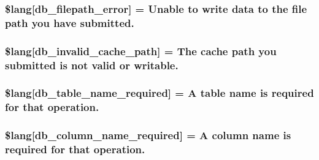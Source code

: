 \subsubsection[{\$lang}]{\setlength{\rightskip}{0pt plus 5cm}\$lang\mbox{[}\textquotesingle{}db\+\_\+filepath\+\_\+error\textquotesingle{}\mbox{]} = \textquotesingle{}Unable to write data to the file path you have submitted.\textquotesingle{}}\label{db__lang_8php_a0519c50a806cec99f29b499aec2582e5}
\hypertarget{db__lang_8php_a67157df2896b342e247ab744adf2b9e5}{}
\subsubsection[{\$lang}]{\setlength{\rightskip}{0pt plus 5cm}\$lang\mbox{[}\textquotesingle{}db\+\_\+invalid\+\_\+cache\+\_\+path\textquotesingle{}\mbox{]} = \textquotesingle{}The cache path you submitted is not valid or writable.\textquotesingle{}}\label{db__lang_8php_a67157df2896b342e247ab744adf2b9e5}
\hypertarget{db__lang_8php_a2899cf8f7246d7fa97660ea52856ade5}{}
\subsubsection[{\$lang}]{\setlength{\rightskip}{0pt plus 5cm}\$lang\mbox{[}\textquotesingle{}db\+\_\+table\+\_\+name\+\_\+required\textquotesingle{}\mbox{]} = \textquotesingle{}A table name is required for that operation.\textquotesingle{}}\label{db__lang_8php_a2899cf8f7246d7fa97660ea52856ade5}
\hypertarget{db__lang_8php_ac87ab86a1f105d87327480b6d0659b13}{}
\subsubsection[{\$lang}]{\setlength{\rightskip}{0pt plus 5cm}\$lang\mbox{[}\textquotesingle{}db\+\_\+column\+\_\+name\+\_\+required\textquotesingle{}\mbox{]} = \textquotesingle{}A column name is required for that operation.\textquotesingle{}}\label{db__lang_8php_ac87ab86a1f105d87327480b6d0659b13}
\hypertarget{db__lang_8php_ad0ba270704ec81f8f89e486a18660354}{}
